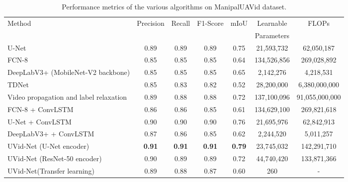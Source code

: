 \documentclass[journal]{IEEEtran}
\begin{document}
\begin{table*}[!h]
	\begin{center}
		\begin{tabular}{|l|c|c|c|c|c|c|}
			\hline
			Method & Precision&Recall&F1-Score &mIoU &Learnable & FLOPs\\
			&   &   &   &   &Parameters&\\
			\hline\hline
			U-Net \cite{2} &0.89&	0.89&	0.89	&	0.75&21,593,732 &62,050,187\\
			\hline
			FCN-8 \cite{4} & 0.85&	0.85&	0.85&		0.64&134,526,856& 269,028,892 \\
			\hline
			DeepLabV3+ (MobileNet-V2 backbone) \cite{33} &0.85&	0.85&	0.85&		0.65&2,142,276& 4,218,531\\
			\hline
			\hline
			TDNet \cite{hu2020temporally} & 0.85&	0.83&0.82&	0.52&	28,200,000&	6,380,000,000\\
			\hline
			Video propagation and label relaxation\cite{22}  &  0.89&0.88 &0.88 & 0.72&137,100,096&91,055,000,000\\
			\hline 
			FCN-8 + ConvLSTM \cite{wang2019deep}  &0.86 & 0.86&0.85 &0.61&134,629,100&269,821,618 \\
			\hline 
			U-Net + ConvLSTM & 0.90& 0.90& 0.90&0.76&21,695,976&62,842,913\\
			\hline
			DeepLabV3+ + ConvLSTM &0.87 &0.86 &0.85 &0.62&2,244,520&5,011,257\\
			\hline
			
			\hline
			UVid-Net (U-Net encoder)&\textbf{0.91}&	\textbf{0.91}&	\textbf{0.91}&		\textbf{0.79}&23,745,032&142,291,710\\
			\hline
			UVid-Net (ResNet-50 encoder)&0.90	&0.89	&0.89	&0.72&44,740,420&133,871,366\\
			\hline
			UVid-Net(Transfer learning) &0.89&0.88&0.87&0.60&260&-\\\hline
			
		\end{tabular}
	\end{center}
	\caption{Performance metrics of the various algorithms on ManipalUAVid dataset.}
	\label{table1}
\end{table*}
\end{document}
